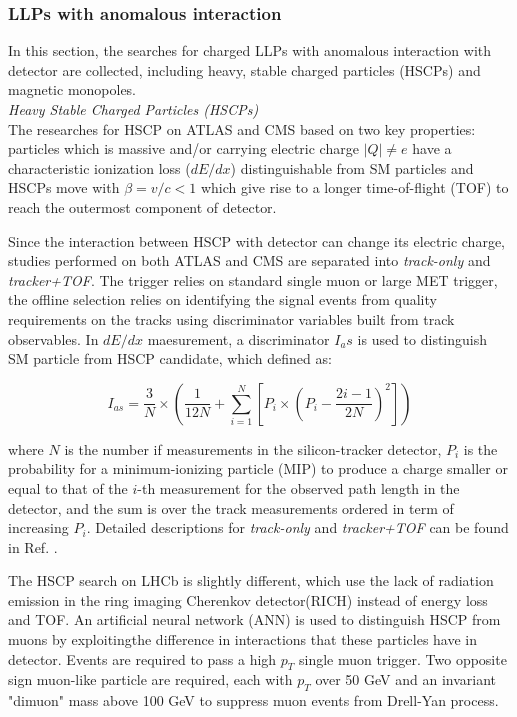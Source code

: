 \subsubsection{LLPs with anomalous interaction}

In this section, the searches for charged LLPs with anomalous interaction with detector are collected, including heavy, stable charged particles (HSCPs) and magnetic monopoles.\\

\textit{Heavy Stable Charged Particles (HSCPs)}\\

 The researches for HSCP on ATLAS and CMS based on two key properties: particles which is  massive and/or carrying electric charge $|Q| \neq e$ have a characteristic ionization loss ($dE/dx$) distinguishable from SM particles and HSCPs move with $\beta = v/c < 1$ which give rise to a longer time-of-flight (TOF) to reach the outermost component of detector. 

Since the interaction between HSCP with detector can change its electric charge, studies performed on both ATLAS and CMS are separated into \textit{track-only} and \textit{tracker+TOF}. The trigger relies on standard single muon or large MET trigger, the offline selection relies on identifying the signal events from quality requirements on the tracks using discriminator variables built from track observables. In $dE/dx$ maesurement,
 a discriminator $I_as$ is used to distinguish SM particle from HSCP candidate, which defined as:
 
 \begin{equation}
     I_{as} = \frac{3}{N}\times(\frac{1}{12N}+\sum_{i=1}^{N}[P_{i}\times(P_{i}-\frac{2i-1}{2N})^2])
 \end{equation}
 
 where $N$ is the number if measurements in the silicon-tracker detector, $P_i$ is the probability for a minimum-ionizing particle (MIP) to produce a charge smaller or equal to that of the $i$-th measurement for the observed path length in the detector, and the sum is over the track measurements ordered in term of increasing $P_i$. Detailed descriptions for \textit{track-only} and \textit{tracker+TOF} can be found in Ref. \cite{CMSHSCP2016}.

The HSCP search on LHCb is slightly different, which use the lack of radiation emission in the ring imaging Cherenkov detector(RICH) instead of energy loss and TOF. An artificial neural network (ANN) is used to distinguish HSCP from muons by exploitingthe difference in interactions that these particles have in detector. Events are required to pass a high $p_T$ single muon trigger. Two opposite sign muon-like particle are required, each with $p_T$ over 50 GeV and an invariant "dimuon" mass above 100 GeV to suppress muon events from Drell-Yan process.
 

